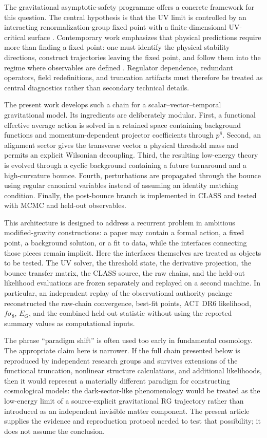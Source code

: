 \documentclass[12pt]{iopart}
\begin{document}
The gravitational asymptotic-safety programme offers a concrete framework for this question.  The central hypothesis is that the UV limit is controlled by an interacting renormalization-group fixed point with a finite-dimensional UV-critical surface \cite{Weinberg1979,Reuter1998,Saueressig2023}.  Contemporary work emphasizes that physical predictions require more than finding a fixed point: one must identify the physical stability directions, construct trajectories leaving the fixed point, and follow them into the regime where observables are defined \cite{Knorr2023,DAngelo2024,BeckerKurovSaueressig2024,SaueressigSilva2024,Thiemann2024}.  Regulator dependence, redundant operators, field redefinitions, and truncation artifacts must therefore be treated as central diagnostics rather than secondary technical details.

The present work develops such a chain for a scalar--vector--temporal gravitational model.  Its ingredients are deliberately modular.  First, a functional effective average action is solved in a retained space containing background functions and momentum-dependent projector coefficients through $p^8$.  Second, an alignment sector gives the transverse vector a physical threshold mass and permits an explicit Wilsonian decoupling.  Third, the resulting low-energy theory is evolved through a cyclic background containing a future turnaround and a high-curvature bounce.  Fourth, perturbations are propagated through the bounce using regular canonical variables instead of assuming an identity matching condition.  Finally, the post-bounce branch is implemented in CLASS and tested with MCMC and held-out observables.

This architecture is designed to address a recurrent problem in ambitious modified-gravity constructions: a paper may contain a formal action, a fixed point, a background solution, or a fit to data, while the interfaces connecting those pieces remain implicit.  Here the interfaces themselves are treated as objects to be tested.  The UV solver, the threshold state, the derivative projection, the bounce transfer matrix, the CLASS source, the raw chains, and the held-out likelihood evaluations are frozen separately and replayed on a second machine.  In particular, an independent replay of the observational authority package reconstructed the raw-chain convergence, best-fit points, ACT DR6 likelihood, $f\sigma_8$, $E_G$, and the combined held-out statistic without using the reported summary values as computational inputs.

The phrase ``paradigm shift'' is often used too early in fundamental cosmology.  The appropriate claim here is narrower.  If the full chain presented below is reproduced by independent research groups and survives extensions of the functional truncation, nonlinear structure calculations, and additional likelihoods, then it would represent a materially different paradigm for constructing cosmological models: the dark-sector-like phenomenology would be treated as the low-energy limit of a source-explicit gravitational RG trajectory rather than introduced as an independent invisible matter component.  The present article supplies the evidence and reproduction protocol needed to test that possibility; it does not assume the conclusion.
\end{document}
